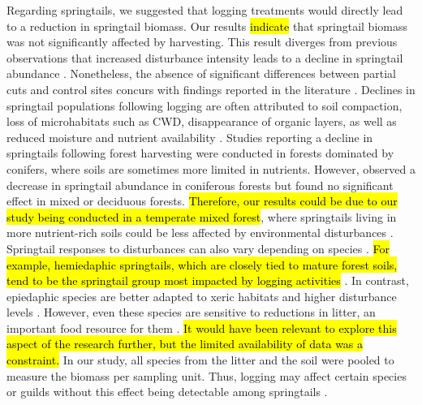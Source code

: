 Regarding springtails, we suggested that logging treatments would directly lead to a reduction in springtail biomass. 
Our results \hl{indicate} that springtail biomass was not significantly affected by harvesting. 
This result diverges from previous observations that increased disturbance intensity leads to a decline in springtail abundance \citep{Lindo2004Forestfloor,Laigle2021Directindirect,Kudrin2023metaanalysiseffects}. 
Nonetheless, the absence of significant differences between partial cuts and control sites concurs with findings reported in the literature \citep{Kudrin2023metaanalysiseffects}. 
Declines in springtail populations following logging are often attributed to soil compaction, loss of microhabitats such as CWD, 
disappearance of organic layers, as well as reduced moisture and nutrient availability \citep{Bird1986Effectwholetree,Baath1995Microbialcommunity,Lindo2004Forestfloor,rousseauForestFloorMesofauna2018}. 
Studies reporting a decline in springtails following forest harvesting were conducted in forests dominated by conifers, where soils are sometimes more limited in nutrients. 
However, \cite{Kudrin2023metaanalysiseffects} observed a decrease in springtail abundance in coniferous forests but found no significant effect in mixed or deciduous forests. 
\hl{Therefore, our results could be due to our study being conducted in a temperate mixed forest}, where springtails living in more nutrient-rich soils could be less affected by environmental disturbances \citep{chauvatChangesSoilFaunal2011a}. 
Springtail responses to disturbances can also vary depending on species \citep{raymond-leonardSpringtailCommunityStructure2018a}. 
\hl{For example, hemiedaphic springtails, which are closely tied to mature forest soils, tend to be the springtail group most impacted by logging activities} \citep{Laigle2021Directindirect}. 
In contrast, epiedaphic species are better adapted to xeric habitats and higher disturbance levels \citep{Makkonen2011Traitsexplain,rousseauWoodyBiomassRemoval2019}. 
However, even these species are sensitive to reductions in litter, an important food resource for them \citep{rousseauForestFloorMesofauna2018}. 
\hl{It would have been relevant to explore this aspect of the research further, but the limited availability of data was a constraint. }
In our study, all species from the litter and the soil were pooled to measure the biomass per sampling unit. 
Thus, logging may affect certain species or guilds without this effect being detectable among springtails \citep{Addison1998Responsesoil}. 


